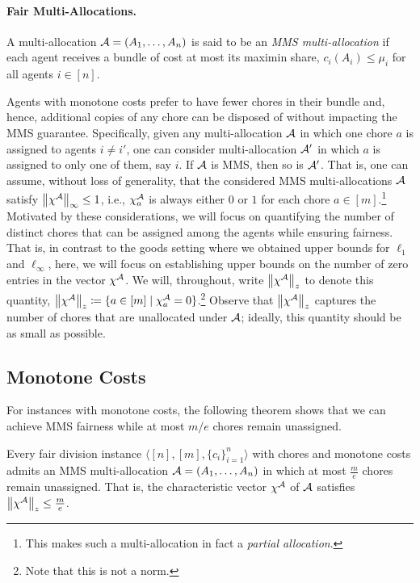 \paragraph{Fair Multi-Allocations.} A multi-allocation $\mathcal{A}=(A_1,\dots,A_n)$ is said to be an \emph{MMS multi-allocation} if each agent receives a bundle of cost at most its maximin share, $c_i(A_i)\leq \mu_i$ for all agents $i \in [n]$.


Agents with monotone costs prefer to have fewer chores in their bundle and, hence, additional copies of any chore can be disposed of without impacting the MMS guarantee. Specifically, given any multi-allocation $\mathcal{A}$ in which one chore $a$ is assigned to agents $i \neq i'$, one can consider multi-allocation $\mathcal{A}'$ in which $a$ is assigned to only one of them, say $i$. If $\mathcal{A}$ is MMS, then so is $\mathcal{A}'$. That is, one can assume, without loss of generality, that the considered MMS multi-allocations $\mathcal{A}$ satisfy $\left\|\chi^{\mathcal{A}}\right\|_\infty \leq 1$, i.e., $\chi^{\mathcal{A}}_a$ is always either $0$ or $1$ for each chore $a \in [m]$.\footnote{This makes such a multi-allocation in fact a \textit{partial allocation}.} Motivated by these considerations,  we will focus on quantifying the number of distinct chores that can be assigned among the agents while ensuring fairness. That is, in contrast to the goods setting where we obtained upper bounds for $\ell_1$ and $\ell_\infty$, here, we will focus on establishing upper bounds on the number of zero entries in the vector $\chi^{\mathcal{A}}$. We will, throughout, write $\left\|\chi^{\mathcal{A}}\right\|_z$ to denote this quantity, $\left\|\chi^{\mathcal{A}}\right\|_z \coloneqq \{ a \in [m] \mid \chi^{\mathcal{A}}_a = 0 \}$.\footnote{Note that this is not a norm.} Observe that $\left\|\chi^{\mathcal{A}}\right\|_z$ captures the number of chores that are unallocated under $\mathcal{A}$; ideally, this quantity should be as small as possible. 


\subsection{Monotone Costs}
For instances with monotone costs, the following theorem shows that we can achieve MMS fairness while at most $m/e$ chores remain unassigned.

\begin{theorem}
\label{thm:monotone_chores}
    Every fair division instance $\langle [n], [m], \{c_i\}_{i=1}^n \rangle$ with chores and monotone costs admits an MMS multi-allocation $\mathcal{A}=(A_1,\dots,A_n)$ in which at most $\frac{m}{e}$ chores remain unassigned. That is, the characteristic vector $\chi^{\mathcal{A}}$ of $\mathcal{A}$ satisfies $\left\|\chi^{\mathcal{A}}\right\|_z\leq\frac{m}{e}$. 
\end{theorem}

